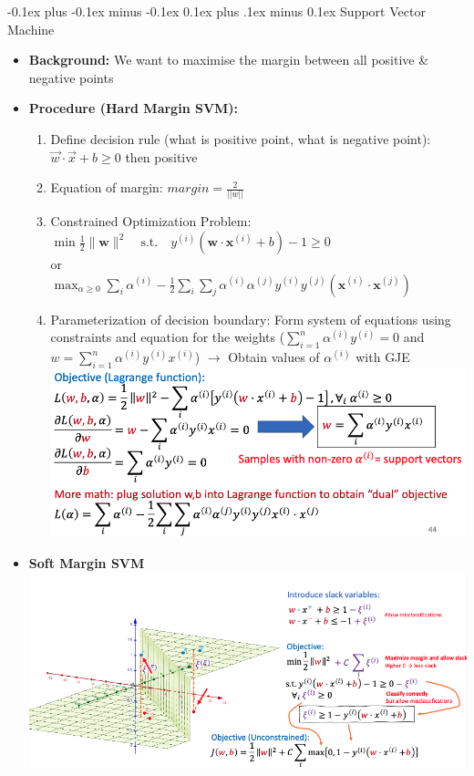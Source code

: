 \documentclass[landscape]{article}
\makeatletter
\renewcommand{\subsection}{\@startsection{subsection}{2}{0mm}%
  {-0.1ex plus -0.1ex minus -0.1ex}%
  {0.1ex plus .1ex minus 0.1ex}%
{\normalfont\scriptsize\bfseries}}
\makeatother
\begin{document}
\begin{multicols*}{5}
        \subsection{Support Vector Machine}
        \begin{itemize}
          \item \textbf{Background:} We want to maximise the margin between all positive \& negative points
          \item \textbf{Procedure (Hard Margin SVM):}
          \begin{enumerate}
            \item Define decision rule (what is positive point, what is negative point): $\vec{w} \cdot \vec{x} + b \geq 0$ then positive
            \item Equation of margin: $margin = \frac{2}{||w||}$
            \item Constrained Optimization Problem: $\min \frac{1}{2} \|\mathbf{w}\|^2 \quad \text{s.t.} \quad y^{(i)} \left( \mathbf{w} \cdot \mathbf{x}^{(i)} + b \right) - 1 \geq 0$ \\ or \\ $\max_{\alpha \geq 0} \sum_{i} \alpha^{(i)} - \frac{1}{2} \sum_{i} \sum_{j} \alpha^{(i)} \alpha^{(j)} y^{(i)} y^{(j)}  \left( \mathbf{x}^{(i)} \cdot \mathbf{x}^{(j)} \right)$
            \item Parameterization of decision boundary: Form system of equations using constraints and equation for the weights ($\sum_{i=1}^n\alpha^{(i)}y^{(i)}=0$ and $w=\sum_{i=1}^n\alpha^{(i)}y^{(i)}x^{(i)}$) $\rightarrow$ Obtain values of $\alpha^{(i)}$ with GJE
            \includegraphics[width=0.85\linewidth]{25_lang_func.png}
          \end{enumerate}
          \item \textbf{Soft Margin SVM}
          \includegraphics[width=0.95\linewidth]{21_softmargin.png}

\end{itemize}
\end{multicols*}
\end{document}
